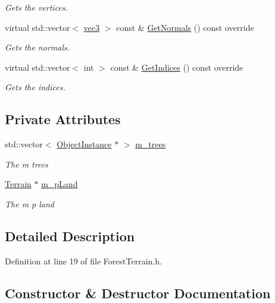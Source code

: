 \begin{DoxyCompactItemize}
\begin{DoxyCompactList}\small\item\em Gets the vertices. \end{DoxyCompactList}\item 
virtual std\+::vector$<$ \hyperlink{_types_8h_a3d0ce73e3199de81565fb01632415288}{vec3} $>$ const \& \hyperlink{class_forest_terrain_a4468dfa3bf8afe31382e0aac4f0a15af}{Get\+Normals} () const  override
\begin{DoxyCompactList}\small\item\em Gets the normals. \end{DoxyCompactList}\item 
virtual std\+::vector$<$ int $>$ const \& \hyperlink{class_forest_terrain_a565602d0a4ebdb6a8fe30563d5e1f1e0}{Get\+Indices} () const  override
\begin{DoxyCompactList}\small\item\em Gets the indices. \end{DoxyCompactList}\end{DoxyCompactItemize}
\subsection*{Private Attributes}
\begin{DoxyCompactItemize}
\item 
std\+::vector$<$ \hyperlink{class_object_instance}{Object\+Instance} $\ast$ $>$ \hyperlink{class_forest_terrain_a4e5d3e48f4b6169c7feda855d3b104b2}{m\+\_\+trees}
\begin{DoxyCompactList}\small\item\em The m trees \end{DoxyCompactList}\item 
\hyperlink{class_terrain}{Terrain} $\ast$ \hyperlink{class_forest_terrain_a6ef2f670fa4b4e1a9500a87c927d2a5c}{m\+\_\+p\+Land}
\begin{DoxyCompactList}\small\item\em The m p land \end{DoxyCompactList}\end{DoxyCompactItemize}


\subsection{Detailed Description}


Definition at line 19 of file Forest\+Terrain.\+h.



\subsection{Constructor \& Destructor Documentation}
